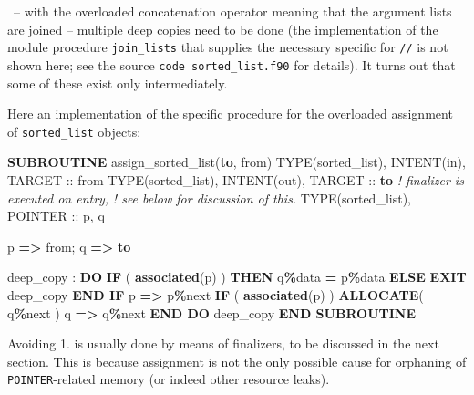\documentclass[
  paper=a4,
  ,captions=tableheading
]{scrartcl}
\newenvironment{Shaded}{\begin{snugshade}}{\end{snugshade}}
\newcommand{\CommentTok}[1]{\textcolor[rgb]{0.56,0.35,0.01}{\textit{#1}}}
\newcommand{\DataTypeTok}[1]{\textcolor[rgb]{0.13,0.29,0.53}{#1}}
\newcommand{\FunctionTok}[1]{\textcolor[rgb]{0.13,0.29,0.53}{\textbf{#1}}}
\newcommand{\KeywordTok}[1]{\textcolor[rgb]{0.13,0.29,0.53}{\textbf{#1}}}
\newcommand{\NormalTok}[1]{#1}
\newcommand{\OperatorTok}[1]{\textcolor[rgb]{0.81,0.36,0.00}{\textbf{#1}}}
\begin{document}
~-- with the overloaded concatenation operator meaning that the argument
lists are joined -- multiple deep copies need to be done (the
implementation of the module procedure \texttt{join\_lists} that
supplies the necessary specific for \texttt{//} is not shown here; see
the source \texttt{code\ sorted\_list.f90} for details). It turns out
that some of these exist only intermediately.

Here an implementation of the specific procedure for the overloaded
assignment of \texttt{sorted\_list} objects:

\begin{Shaded}
\begin{Highlighting}[]
\KeywordTok{SUBROUTINE}\NormalTok{ assign\_sorted\_list(}\KeywordTok{to}\NormalTok{, from)}
   \DataTypeTok{TYPE(sorted\_list)}\NormalTok{, }\DataTypeTok{INTENT(in)}\NormalTok{, }\DataTypeTok{TARGET} \DataTypeTok{::}\NormalTok{ from}
   \DataTypeTok{TYPE(sorted\_list)}\NormalTok{, }\DataTypeTok{INTENT(out)}\NormalTok{, }\DataTypeTok{TARGET} \DataTypeTok{::} \KeywordTok{to}  \CommentTok{! finalizer is executed on entry,}
                                                 \CommentTok{! see below for discussion of this.}
   \DataTypeTok{TYPE(sorted\_list)}\NormalTok{, }\DataTypeTok{POINTER} \DataTypeTok{::}\NormalTok{ p, q}

\NormalTok{   p }\KeywordTok{=}\OperatorTok{\textgreater{}}\NormalTok{ from; q }\KeywordTok{=}\OperatorTok{\textgreater{}} \KeywordTok{to}

\NormalTok{   deep\_copy : }\KeywordTok{DO}
      \KeywordTok{IF}\NormalTok{ ( }\FunctionTok{associated}\NormalTok{(p) ) }\KeywordTok{THEN}
\NormalTok{         q}\OperatorTok{\%}\NormalTok{data }\KeywordTok{=}\NormalTok{ p}\OperatorTok{\%}\NormalTok{data}
      \KeywordTok{ELSE}
         \KeywordTok{EXIT}\NormalTok{ deep\_copy}
      \KeywordTok{END IF}
\NormalTok{      p }\KeywordTok{=}\OperatorTok{\textgreater{}}\NormalTok{ p}\OperatorTok{\%}\NormalTok{next}
      \KeywordTok{IF}\NormalTok{ ( }\FunctionTok{associated}\NormalTok{(p) ) }\KeywordTok{ALLOCATE}\NormalTok{( q}\OperatorTok{\%}\NormalTok{next )}
\NormalTok{      q }\KeywordTok{=}\OperatorTok{\textgreater{}}\NormalTok{ q}\OperatorTok{\%}\NormalTok{next}
   \KeywordTok{END DO}\NormalTok{ deep\_copy}
\KeywordTok{END SUBROUTINE}
\end{Highlighting}
\end{Shaded}

Avoiding 1. is usually done by means of finalizers, to be discussed in
the next section. This is because assignment is not the only possible
cause for orphaning of \texttt{POINTER}-related memory (or indeed other
resource leaks).
\end{document}
